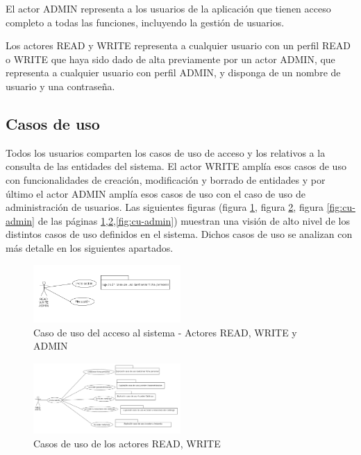 El actor ADMIN representa a los usuarios de la aplicación que tienen
acceso completo a todas las funciones, incluyendo la gestión de usuarios.

Los actores  READ y  WRITE representa a cualquier usuario con un perfil READ o WRITE que haya sido dado de alta previamente por un actor ADMIN, que representa a cualquier usuario con perfil ADMIN, y disponga de un nombre de usuario y una contraseña.



\subsection{Casos de uso}
\label{sub:casos-uso}


Todos los usuarios comparten los casos de uso de acceso y los relativos a la consulta de las entidades del sistema. El actor WRITE amplía esos casos de uso con funcionalidades de creación, modificación y borrado de entidades y por último el actor ADMIN amplía esos casos de uso con el caso de uso de administración de usuarios. Las siguientes figuras (figura \ref{fig:cu-acceso}, figura \ref{fig:cu-read-write}, figura \ref{fig:cu-admin} de las páginas \ref{fig:cu-acceso},\ref{fig:cu-read-write},\ref{fig:cu-admin}) muestran una visión de alto nivel de los distintos casos de uso definidos en el sistema. Dichos casos de uso se analizan con más detalle en los siguientes apartados.


\begin{figure}[H]
  \centering
  \includegraphics[width=0.50\textwidth]{imaxes/cu_acceso.png}
  \caption{Caso de uso del acceso al sistema - Actores READ, WRITE y ADMIN}
  \label{fig:cu-acceso}
\end{figure}



\begin{figure}[H]
  \centering
  \includegraphics[width=0.50\textwidth]{imaxes/cu-read-write.png}
  \caption{Casos de uso de los actores READ, WRITE}
  \label{fig:cu-read-write}
\end{figure}



